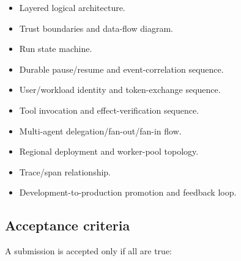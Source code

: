\begin{itemize}

\item Layered logical architecture.

\item Trust boundaries and data-flow diagram.

\item Run state machine.

\item Durable pause/resume and event-correlation sequence.

\item User/workload identity and token-exchange sequence.

\item Tool invocation and effect-verification sequence.

\item Multi-agent delegation/fan-out/fan-in flow.

\item Regional deployment and worker-pool topology.

\item Trace/span relationship.

\item Development-to-production promotion and feedback loop.

\end{itemize}

\subsection{Acceptance criteria}

A submission is accepted only if all are true:\par

